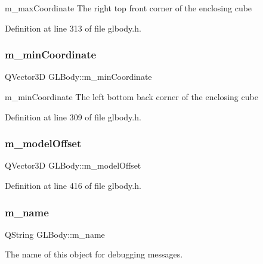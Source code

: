 m\+\_\+max\+Coordinate The right top front corner of the enclosing cube 



Definition at line 313 of file glbody.\+h.

\mbox{\label{class_g_l_body_a6151001e1a78005be6ebbbdbf814ffe3}} 
\subsubsection{\texorpdfstring{m\_minCoordinate}{m\_minCoordinate}}
{\footnotesize\ttfamily Q\+Vector3D G\+L\+Body\+::m\+\_\+min\+Coordinate\hspace{0.3cm}{\ttfamily [protected]}}



m\+\_\+min\+Coordinate The left bottom back corner of the enclosing cube 



Definition at line 309 of file glbody.\+h.

\mbox{\label{class_g_l_body_a8b2d358664d9cac307bee8ba6709b73a}} 
\subsubsection{\texorpdfstring{m\_modelOffset}{m\_modelOffset}}
{\footnotesize\ttfamily Q\+Vector3D G\+L\+Body\+::m\+\_\+model\+Offset\hspace{0.3cm}{\ttfamily [protected]}}



Definition at line 416 of file glbody.\+h.

\mbox{\label{class_g_l_body_a348178ac24c376d6ebfe280ce30ff9c4}} 
\subsubsection{\texorpdfstring{m\_name}{m\_name}}
{\footnotesize\ttfamily Q\+String G\+L\+Body\+::m\+\_\+name\hspace{0.3cm}{\ttfamily [protected]}}

The name of this object for debugging messages. 

